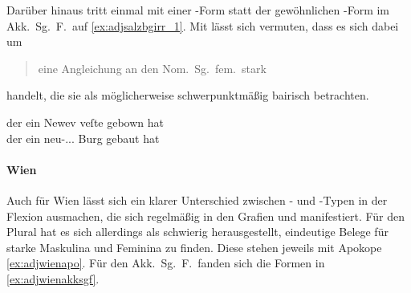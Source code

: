 Darüber hinaus tritt einmal   mit einer -Form
statt der gewöhnlichen -Form im Akk.\ Sg.\ F.\ auf
\cref{ex:adjsalzbgirr_1}. Mit \citet{ksw2} lässt sich vermuten, dass es sich
dabei um \blockcquote[270]{ksw2}{\mbox{eine} Angleichung an den
Nom.~Sg.~fem.~stark} handelt, die sie als möglicherweise schwerpunktmäßig
bairisch betrachten.

\begin{exe}
	\ex \label{ex:adjsalzbgirr_1}
		\gll der ein Newev veſte gebown hat \\
			der ein neu-\Acc.\Sg.\FemI.\St{} Burg gebaut hat \\
		\begin{taggedline}{\parencites(Salzburg, um 1285)[\pno~695, 103.11]{cao2}}
		\trans {}
		\end{taggedline}
\end{exe}

\paragraph{Wien}
\label{par:adjwien}
Auch für Wien lässt sich ein klarer Unterschied zwischen - und
-Typen in der Flexion ausmachen, die sich regelmäßig in den Grafien
 und  manifestiert. Für den Plural hat es sich
allerdings als schwierig herausgestellt, eindeutige Belege für starke Maskulina
und Feminina zu finden. Diese stehen jeweils mit Apokope \cref{ex:adjwienapo}.
Für den Akk.\ Sg.\ F.\ fanden sich die Formen in \cref{ex:adjwienakksgf}.

